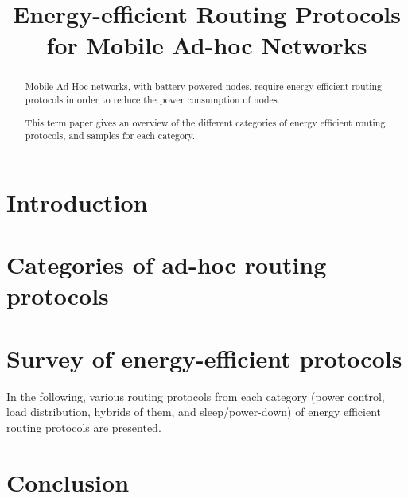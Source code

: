 \documentclass[conference]{IEEEtran}
\begin{document}
\title{Energy-efficient Routing Protocols for Mobile Ad-hoc Networks}
\author{
}

\maketitle



\begin{abstract}
Mobile Ad-Hoc networks, with battery-powered nodes, require energy efficient
routing protocols in order to reduce the power consumption of nodes.

This term paper gives an overview of the different categories of energy
efficient routing protocols, and samples for each category.
\end{abstract}

\section{Introduction}


\section{Categories of ad-hoc routing protocols}


\section{Survey of energy-efficient protocols}
In the following, various routing protocols from each category (power control,
load distribution, hybrids of them, and sleep/power-down) of energy
efficient routing protocols are presented.







\section{Conclusion}




\end{document}
